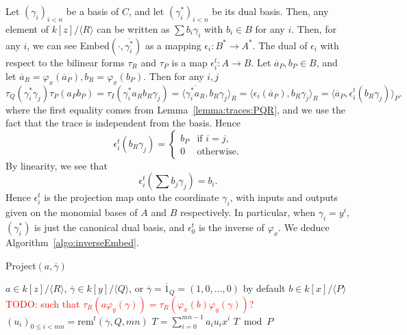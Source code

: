 \documentclass[12pt]{article}
\def\rem {\ensuremath{\mathrm{rem}}}
\newcommand{\ang}[1]{\langle#1\rangle}
\newcommand{\dual}[1]{\overline{#1}}
\newcommand{\todo}[1]{\textcolor{red}{TODO: #1}}
\begin{document}
Let $(\gamma_i)_{i<n}$ be a basis of $C$, and let
$(\gamma_i^\ast)_{i<n}$ be its dual basis. Then, any element of
$k[z]/\ang{R}$ can be written as $\sum b_i\gamma_i$ with $b_i\in B$
for any $i$.  Then, for any $i$, we can see
Embed$\left(\cdot,\dual{\gamma_i^\ast}\right)$ as a mapping
$\epsilon_i:B^\ast\to A^\ast$. The dual of $\epsilon_i$ with respect
to the bilinear forms $\tau_R$ and $\tau_P$ is a map
$\epsilon_i^t:A\to B$. Let $\dual{a}_P,b_P\in B$, and let
$\dual{a}_R=\varphi_x(\dual{a}_P), b_R=\varphi_x(b_P)$. Then for any $i,j$
\begin{equation}
  \label{eq:transpose-embed}
  \tau_Q(\gamma_i^\ast\gamma_j)\tau_P(a_P b_P) = \tau_I(\gamma_i^\ast a_R b_R \gamma_j) = \ang{\dual{\gamma_i^\ast a_R},b_R\gamma_j}_R = \ang{\epsilon_i(\dual{a}_P),b_R\gamma_j}_R = \ang{\dual{a}_P,\epsilon_i^t(b_R\gamma_j)}_P.
\end{equation}
where the first equality comes from Lemma~\ref{lemma:traces:PQR}, and
we use the fact that the trace is independent from the basis. Hence
\begin{equation}
  \epsilon_i^t(b_R\gamma_j) =
  \begin{cases}
    b_P &\text{if $i=j$,}\\
    0  &\text{otherwise.}
  \end{cases}
\end{equation}
By linearity, we see that
\begin{equation}
  \epsilon_i^t \left(\sum b_j\gamma_j\right) = b_i.
\end{equation}
Hence $\epsilon_i^t$ is the projection map onto the coordinate
$\gamma_i$, with inputs and outputs given on the monomial bases of $A$
and $B$ respectively. In particular, when $\gamma_i=y^i$,
$(\gamma_i^\ast)$ is just the canonical dual basis, and $\epsilon_0^t$
is the inverse of $\varphi_x$. We deduce
Algorithm~\ref{algo:inverseEmbed}.


\begin{algorithm}[H]
  \caption{Project$(a,\dual{\gamma})$}
  \begin{algorithmic}[1]
    \REQUIRE $a\in k[z]/\ang{R}$, $\dual{\gamma}\in k[y]/\ang{Q}$, or $\dual{\gamma}=\dual{1}_Q=(1,0,\dots,0)$ by default
    \ENSURE $b\in k[x]/\ang{P}$ \todo{such that $\tau_R(a\varphi_y(\gamma)) = \tau_R(\varphi_x(b)\varphi_y(\gamma))$?}
    \STATE $(u_i)_{0\le i<mn} = \rem^t(\dual{\gamma},Q,mn)$
    \STATE\label{algo:inverseEmbed:dotprod} $T = \sum_{i=0}^{mn-1} a_i u_i x^i$
    \RETURN\label{algo:inverseEmbed:mod} $T \bmod P$
  \end{algorithmic}\label{algo:inverseEmbed}
\end{algorithm}
\end{document}

